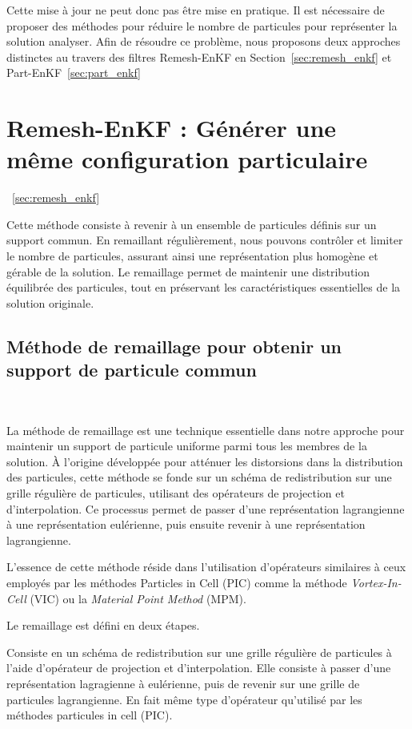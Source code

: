 Cette mise à jour ne peut donc pas être mise en pratique. Il est nécessaire de proposer des méthodes pour réduire le nombre de particules pour représenter la solution analyser. Afin de résoudre ce problème, nous proposons deux approches distinctes au travers des filtres Remesh-EnKF en Section~\ref{sec:remesh_enkf} et Part-EnKF~\ref{sec:part_enkf}

\section{Remesh-EnKF : Générer une même configuration particulaire}~\ref{sec:remesh_enkf}

Cette méthode consiste à revenir à un ensemble de particules définis sur un support commun. En remaillant régulièrement, nous pouvons contrôler et limiter le nombre de particules, assurant ainsi une représentation plus homogène et gérable de la solution. Le remaillage permet de maintenir une distribution équilibrée des particules, tout en préservant les caractéristiques essentielles de la solution originale.

\subsection{Méthode de remaillage pour obtenir un support de particule commun}~\label{sec:remesh}

La méthode de remaillage est une technique essentielle dans notre approche pour maintenir un support de particule uniforme parmi tous les membres de la solution. À l'origine développée pour atténuer les distorsions dans la distribution des particules, cette méthode se fonde sur un schéma de redistribution sur une grille régulière de particules, utilisant des opérateurs de projection et d'interpolation. Ce processus permet de passer d'une représentation lagrangienne à une représentation eulérienne, puis ensuite revenir à une représentation lagrangienne.

L'essence de cette méthode réside dans l'utilisation d'opérateurs similaires à ceux employés par les méthodes Particles in Cell (PIC) comme la méthode \textit{Vortex-In-Cell} (VIC) ou la \textit{Material Point Method} (MPM).

Le remaillage est défini en deux étapes.

Consiste en un schéma de redistribution sur une grille régulière de particules à l'aide d'opérateur de projection et d'interpolation. Elle consiste à passer d'une représentation lagragienne à eulérienne, puis de revenir sur une grille de particules lagrangienne. En fait même type d'opérateur qu'utilisé par les méthodes particules in cell (PIC).

